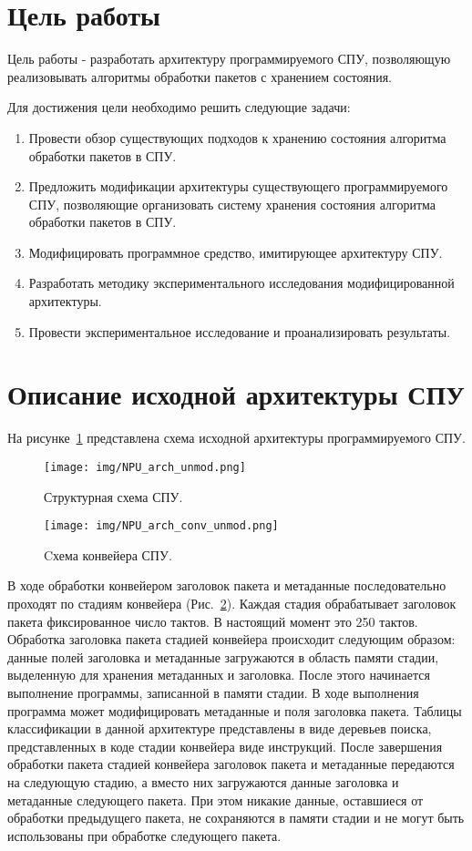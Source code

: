 \documentclass[conference]{IEEEtran}
\begin{document}
\section{Цель работы}
Цель работы - разработать архитектуру программируемого СПУ, позволяющую
реализовывать алгоритмы обработки пакетов с
хранением состояния.

Для достижения цели необходимо решить следующие задачи:
\begin{enumerate}
	\item Провести обзор существующих подходов к хранению
		состояния алгоритма обработки пакетов в СПУ.
	\item Предложить модификации архитектуры существующего
		программируемого СПУ, позволяющие организовать систему
		хранения состояния алгоритма обработки пакетов в СПУ.
	\item Модифицировать программное средство, имитирующее
		архитектуру СПУ.
	\item Разработать методику экспериментального исследования
		модифицированной архитектуры.
	\item Провести экспериментальное исследование и проанализировать
		результаты.
\end{enumerate}

\section{Описание исходной архитектуры СПУ}

На рисунке~\ref{float:arch:general} представлена схема исходной архитектуры
программируемого СПУ.

\begin{figure}
	\centering
	\texttt{[image: img/NPU\_arch\_unmod.png]}
	\caption{Структурная схема СПУ.}
	\label{float:arch:general}
\end{figure}

\begin{figure}
	\centering
	\texttt{[image: img/NPU\_arch\_conv\_unmod.png]}
	\caption{Cхема конвейера СПУ.}
	\label{float:arch:conv}
\end{figure}

В ходе обработки конвейером заголовок пакета и метаданные последовательно
проходят по стадиям конвейера (Рис.~\ref{float:arch:conv}).
Каждая стадия обрабатывает заголовок пакета фиксированное число тактов.
В настоящий момент это 250 тактов.
Обработка заголовка пакета стадией конвейера происходит следующим образом:
данные полей заголовка и метаданные загружаются в область памяти стадии,
выделенную для хранения метаданных и заголовка.
После этого начинается выполнение программы, записанной в памяти стадии.
В ходе выполнения программа может модифицировать метаданные и поля заголовка
пакета. Таблицы классификации в данной архитектуре представлены в виде
деревьев поиска, представленных в коде стадии конвейера виде инструкций.
После завершения обработки пакета стадией конвейера заголовок пакета
и метаданные передаются на следующую стадию, а вместо них загружаются данные
заголовка и метаданные следующего пакета.
При этом никакие данные, оставшиеся от обработки предыдущего пакета,
не сохраняются в памяти стадии и не могут быть использованы при обработке
следующего пакета.
\end{document}
